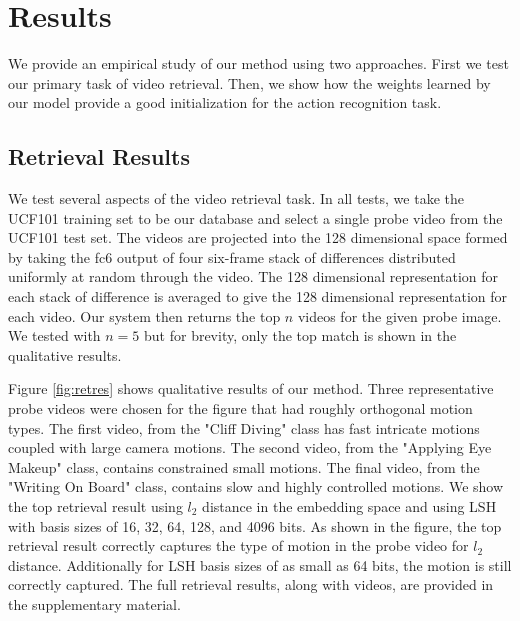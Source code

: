 \section{Results}\label{sec:results}

We provide an empirical study of our method using two approaches. First we test our primary task of video retrieval. Then, we show how the weights learned by our model provide a good initialization for the action recognition task.

\subsection{Retrieval Results}

We test several aspects of the video retrieval task. In all tests, we take the UCF101 training set to be our database and select a single probe video from the UCF101 test set. The videos are projected into the 128 dimensional space formed by taking the fc6 output of four six-frame stack of differences distributed uniformly at random through the video. The 128 dimensional representation for each stack of difference is averaged to give the 128 dimensional representation for each video. Our system then returns the top $n$ videos for the given probe image. We tested with $n=5$ but for brevity, only the top match is shown in the qualitative results.

Figure \ref{fig:retres} shows qualitative results of our method. Three representative probe videos were chosen for the figure that had roughly orthogonal motion types. The first video, from the "Cliff Diving" class has fast intricate motions coupled with large camera motions. The second video, from the "Applying Eye Makeup" class, contains constrained small motions. The final video, from the "Writing On Board" class, contains slow and highly controlled motions. We show the top retrieval result using $l_2$ distance in the embedding space and using LSH with basis sizes of 16, 32, 64, 128, and 4096 bits. As shown in the figure, the top retrieval result correctly captures the type of motion in the probe video for $l_2$ distance. Additionally for LSH basis sizes of as small as 64 bits, the motion is still correctly captured. The full retrieval results, along with videos, are provided in the supplementary material.

